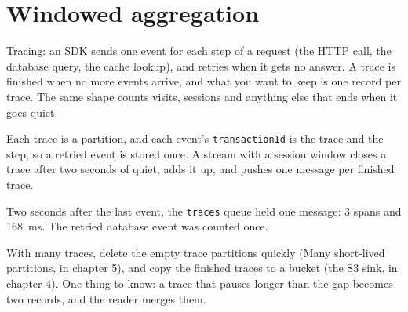 %

\section{Windowed aggregation}

Tracing: an SDK sends one event for each step of a request (the HTTP call, the database query, the
cache lookup), and retries when it gets no answer. A trace is finished when no more events arrive,
and what you want to keep is one record per trace. The same shape counts visits, sessions and
anything else that ends when it goes quiet.

Each trace is a partition, and each event's \texttt{transactionId} is the trace and the step, so a
retried event is stored once. A stream with a session window closes a trace after two seconds of
quiet, adds it up, and pushes one message per finished trace.



Two seconds after the last event, the \texttt{traces} queue held one message: 3 spans and 168~ms.
The retried database event was counted once.


With many traces, delete the empty trace partitions quickly (Many short-lived partitions, in
chapter 5), and copy the finished traces to a bucket (the S3 sink, in chapter 4). One thing to
know: a trace that pauses longer than the gap becomes two records, and the reader merges them.
